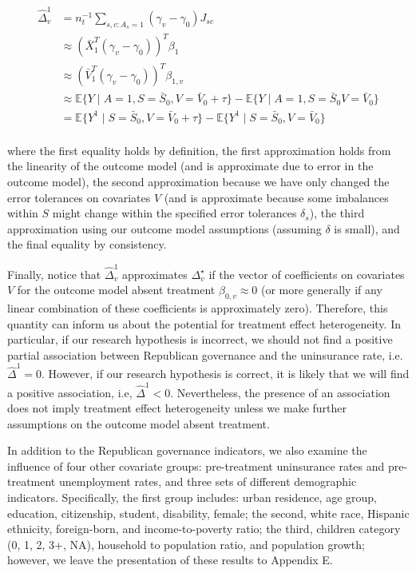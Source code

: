 \documentclass[aoas]{imsart}
\theoremstyle{plain}
\theoremstyle{remark}
\begin{document}
\begin{align*}
    \hat{\Delta}^1_v &= n_t^{-1}\sum_{s, c: A_s = 1}(\gamma_v - \gamma_0)J_{sc} \\ 
    &\approx (\bar{X}_1^T(\gamma_v - \gamma_0))^T\beta_1 \\
    &\approx (\bar{V}_1^T(\gamma_v - \gamma_0))^T\beta_{1, v} \\
    &\approx \mathbb{E}\{Y \mid A = 1, S = \bar{S}_0, V = \bar{V}_0 + \tau\} - \mathbb{E}\{Y \mid A = 1, S = \bar{S}_0 V = \bar{V}_0\} \\
    &= \mathbb{E}\{Y^1 \mid S = \bar{S}_0, V = \bar{V}_0 + \tau\} - \mathbb{E}\{Y^1 \mid S = \bar{S}_0, V = \bar{V}_0\} \\
\end{align*}

where the first equality holds by definition, the first approximation holds from the linearity of the outcome model (and is approximate due to error in the outcome model), the second approximation because we have only changed the error tolerances on covariates $V$ (and is approximate because some imbalances within $S$ might change within the specified error tolerances $\delta_s$), the third approximation using our outcome model assumptions (assuming $\delta$ is small), and the final equality by consistency. 

Finally, notice that $\hat{\Delta}^1_v$ approximates $\Delta^\star_v$ if the vector of coefficients on covariates $V$ for the outcome model absent treatment $\beta_{0, v} \approx 0$ (or more generally if any linear combination of these coefficients is approximately zero). Therefore, this quantity can inform us about the potential for treatment effect heterogeneity. In particular, if our research hypothesis is incorrect, we should not find a positive partial association between Republican governance and the uninsurance rate, i.e. $\hat{\Delta}^1 = 0$. However, if our research hypothesis is correct, it is likely that we will find a positive association, i.e, $\hat{\Delta}^1 < 0$. Nevertheless, the presence of an association does not imply treatment effect heterogeneity unless we make further assumptions on the outcome model absent treatment.

In addition to the Republican governance indicators, we also examine the influence of four other covariate groups: pre-treatment uninsurance rates and pre-treatment unemployment rates, and three sets of different demographic indicators. Specifically, the first group includes: urban residence, age group, education, citizenship, student, disability, female; the second, white race, Hispanic ethnicity, foreign-born, and income-to-poverty ratio; the third, children category (0, 1, 2, 3+, NA), household to population ratio, and population growth; however, we leave the presentation of these results to Appendix E.
\end{document}
